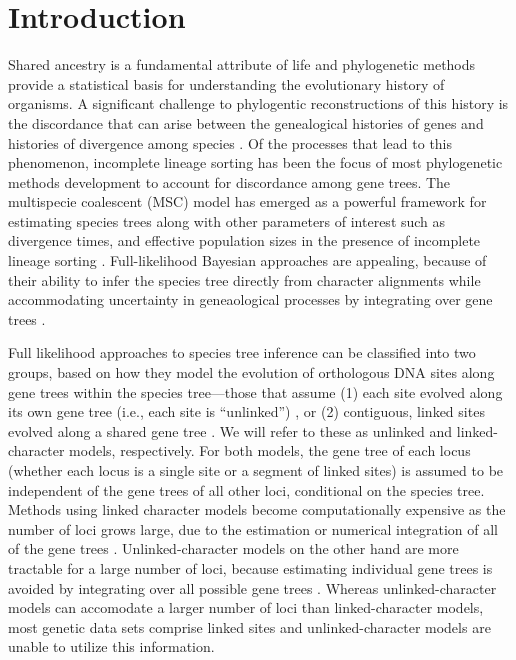 \section{Introduction}

Shared ancestry is a fundamental attribute of life and phylogenetic methods 
provide a statistical basis for understanding the evolutionary history of organisms.
A significant challenge to phylogentic reconstructions of this history is the 
discordance that can arise between the genealogical histories of genes and 
histories of divergence among species \citep{maddisonGeneTreesSpecies1997}.
Of the processes that lead to this phenomenon, incomplete lineage sorting has 
been the focus of most phylogenetic methods development to account for discordance
among gene trees. The multispecie coalescent (MSC) model has emerged as a 
powerful framework for estimating species trees along with other parameters of 
interest such as divergence times, and effective population sizes in the 
presence of incomplete lineage sorting \citep{xuChallengesSpeciesTree2016}.
Full-likelihood Bayesian approaches are appealing, because of their ability to
infer the species tree directly from character alignments while accommodating
uncertainty in geneaological processes by integrating over gene trees
\citep{rannalaEfficientBayesianSpecies2017}.

Full likelihood approaches to species tree inference can be
classified into two groups, based on how they model the 
evolution of orthologous DNA sites along gene trees within the species 
tree---those that assume (1) each site evolved along its own gene tree 
(i.e., each site is ``unlinked'') 
\citep{bryantInferringSpeciesTrees2012, maioPoMoAlleleFrequencyBased2015}, 
or (2) contiguous, linked sites evolved along a shared gene tree 
\citep{liuSpeciesTreesGene2007, Heled2010, ogilvieStarBEAST2BringsFaster2017, 
yangBPPProgramSpecies2015}. We will refer to these as unlinked and 
linked-character models, respectively. For both models, the gene tree of each 
locus (whether each locus is a single site or a segment of linked sites) 
is assumed to be independent of the gene 
trees of all other loci, conditional on the species tree.
Methods using linked character models become computationally expensive as the
number of loci grows large, due to the estimation or numerical integration of
all of the gene trees \citep{bryantInferringSpeciesTrees2012}.
Unlinked-character models on the other 
hand are more tractable for a large number of loci, because  estimating 
individual gene trees is avoided by integrating over all possible gene trees 
\citep{bryantInferringSpeciesTrees2012}.
Whereas unlinked-character models can accomodate a larger number of loci than
linked-character models, most genetic data sets comprise linked sites and
unlinked-character models are unable to utilize this information.


